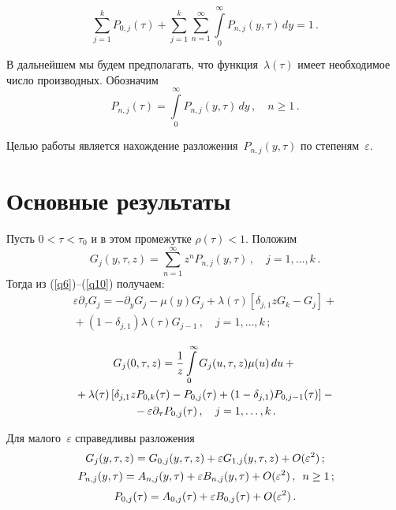 \begin{multicols}{2}
\vspace*{-8pt}

\noindent
\begin{equation*}
\sum_{j=1}^{k} P_{0,j}(\tau)+\sum_{j=1}^{k}
\sum_{n=1}^\infty\int\limits_{0}^\infty P_{n,j}(y,\tau)\,dy=1\,.
\end{equation*}

В дальнейшем мы будем предполагать, что функция~$\lambda(\tau)$ имеет необходимое число производных. Обозначим
$$
P_{n,j}(\tau)=\int\limits_{0}^{\infty} P_{n,j}(y,\tau)\,dy\,,\quad n \geq 1\,.
$$

Целью работы является нахождение разложения~$P_{n,j}(y,\tau)$ по степеням~$\varepsilon$.

\section{Основные результаты}


Пусть  $0<\tau<\tau_{0}$ и в этом промежутке $\rho(\tau)<1$.
Положим
$$
G_{j}(y,\tau,z)=\sum_{n=1}^{\infty} z^{n}P_{n,j}(y,\tau)\,,\quad j=1,\ldots ,k\,.
$$
Тогда из (\ref{q6})--(\ref{q10}) получаем:
\begin{multline}
\varepsilon\partial_{\tau}G_{j}=-\partial_{y}G_{j}-\mu(y)G_{j}+\lambda(\tau)[\delta_{j,1}zG_{k}-G_{j}]+{}\\
{}+
(1-\delta_{j,1})\lambda(\tau)G_{j-1}\,,\quad  j=1,\ldots , k\,;
\label{q11}
\end{multline}


\noindent
\begin{multline}
G_{j}(0,\tau,z)=\displaystyle\frac{\displaystyle 1\mathstrut}{\displaystyle z\mathstrut}\int\limits_{0}^{\infty}G_{j}(u,\tau,z)\mu(u)\,du+{}\\
{}+\lambda(\tau)\left[\delta_{j,1}zP_{0,k}(\tau)- P_{0,j}(\tau)+
(1-\delta_{j,1})P_{0,j-1}(\tau)\right]-{}\\
{}- \varepsilon\partial_{\tau}P_{0,j}(\tau)\,,
\quad j=1,\ldots , k\,.
\label{q12}
\end{multline}

 Для малого~$\varepsilon$ справедливы разложения
\begin{gather*}
G_{j}(y,\tau,z)=G_{0,j}(y,\tau,z)+\varepsilon
G_{1,j}(y,\tau,z)+O(\varepsilon^{2})\,;
\\
P_{n,j}(y,\tau)=A_{n,j}(y,\tau)+\varepsilon
B_{n,j}(y,\tau)+O(\varepsilon^{2})\,,\enskip n \geq 1\,;\hspace*{-1.9pt}
\\[2pt]
P_{0,j}(\tau)=A_{0,j}(\tau)+\varepsilon B_{0,j}(\tau)+O(\varepsilon^{2})\,.
\end{gather*}


\end{multicols}
